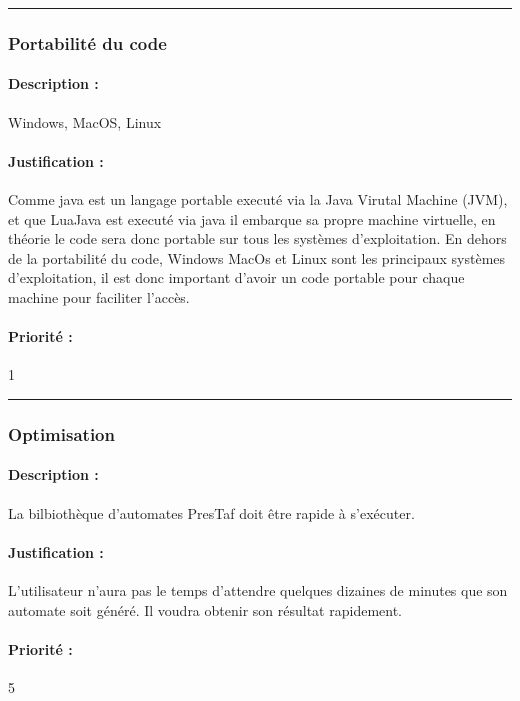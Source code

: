 \documentclass{article}%
\begin{document}
\rule{\linewidth}{1pt}

\subsubsection{Portabilité du code}

\paragraph{Description :} Windows, MacOS, Linux

\paragraph{Justification :} Comme java est un langage portable executé via la Java Virutal Machine (JVM), et que LuaJava est executé via java il embarque sa propre machine virtuelle, en théorie le code sera donc portable sur tous les systèmes d'exploitation. En dehors de la portabilité du code, Windows MacOs et Linux sont les principaux systèmes d'exploitation, il est donc important d'avoir un code portable pour chaque machine pour faciliter l'accès.

\paragraph{Priorité :} 1\\

\rule{\linewidth}{1pt}

\subsubsection{Optimisation}

\paragraph{Description :} La bilbiothèque d'automates PresTaf doit être rapide à s'exécuter.

\paragraph{Justification :} L'utilisateur n'aura pas le temps d'attendre quelques dizaines de minutes que son automate soit généré. Il voudra obtenir son résultat rapidement.

\paragraph{Priorité :} 5
\end{document}
